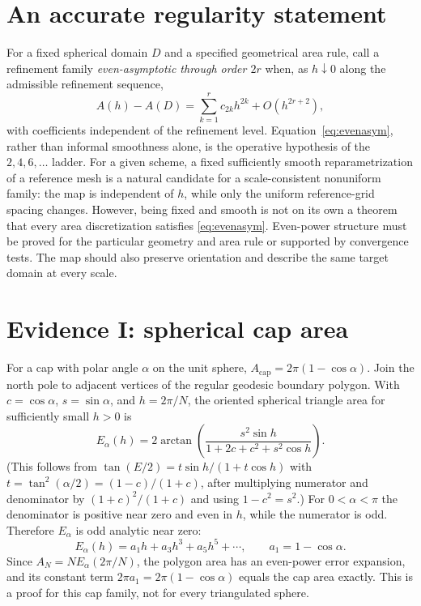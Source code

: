 \documentclass[11pt]{article}
\theoremstyle{remark}
\begin{document}
\section{An accurate regularity statement}
For a fixed spherical domain $D$ and a specified geometrical area rule, call a refinement
family \emph{even-asymptotic through order $2r$} when, as $h\downarrow0$ along the admissible
refinement sequence,
\begin{equation}\label{eq:evenasym}
A(h)-A(D)=\sum_{k=1}^{r}c_{2k}h^{2k}+O(h^{2r+2}),
\end{equation}
with coefficients independent of the refinement level. Equation~\eqref{eq:evenasym}, rather
than informal smoothness alone, is the operative hypothesis of the $2,4,6,\dots$ ladder. For a
given scheme, a fixed sufficiently smooth reparametrization of a reference mesh is a natural
candidate for a scale-consistent nonuniform family: the map is independent of $h$, while only
the uniform reference-grid spacing changes. However, being fixed and smooth is not on its own a
theorem that every area discretization satisfies \eqref{eq:evenasym}. Even-power structure must
be proved for the particular geometry and area rule or supported by convergence tests. The map
should also preserve orientation and describe the same target domain at every scale.

\section{Evidence I: spherical cap area}
For a cap with polar angle $\alpha$ on the unit sphere, $A_{\mathrm{cap}}=2\pi(1-\cos\alpha)$.
Join the north pole to adjacent vertices of the regular geodesic boundary polygon. With
$c=\cos\alpha$, $s=\sin\alpha$, and $h=2\pi/N$, the oriented spherical triangle area for
sufficiently small $h>0$ is
\begin{equation}\label{eq:E}
E_\alpha(h)=2\arctan\!\left(\frac{s^{2}\sin h}{1+2c+c^{2}+s^{2}\cos h}\right).
\end{equation}
(This follows from $\tan(E/2)=t\sin h/(1+t\cos h)$ with $t=\tan^2(\alpha/2)=(1-c)/(1+c)$,
after multiplying numerator and denominator by $(1+c)^2/(1+c)$ and using $1-c^2=s^2$.)
For $0<\alpha<\pi$ the denominator is positive near zero and even in $h$, while the numerator
is odd. Therefore $E_\alpha$ is odd analytic near zero:
\[
E_\alpha(h)=a_1h+a_3h^3+a_5h^5+\cdots,\qquad a_1=1-\cos\alpha .
\]
Since $A_N=NE_\alpha(2\pi/N)$, the polygon area has an even-power error expansion, and its
constant term $2\pi a_1=2\pi(1-\cos\alpha)$ equals the cap area exactly. This is a proof for
this cap family, not for every triangulated sphere.
\end{document}
